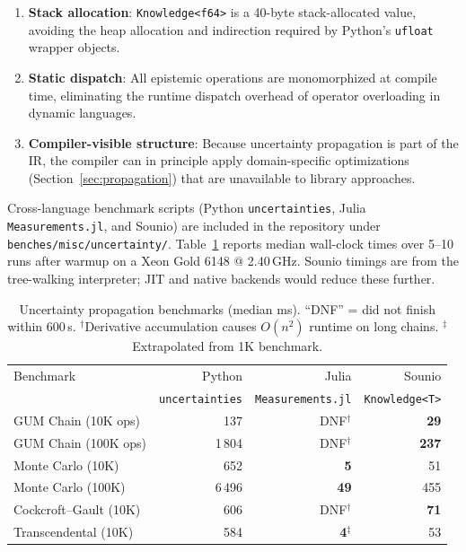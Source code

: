 \documentclass[11pt,a4paper]{article}
\begin{document}
\begin{enumerate}
  \item \textbf{Stack allocation}: \texttt{Knowledge<f64>} is a 40-byte
        stack-allocated value, avoiding the heap allocation and indirection
        required by Python's \texttt{ufloat} wrapper objects.
  \item \textbf{Static dispatch}: All epistemic operations are monomorphized
        at compile time, eliminating the runtime dispatch overhead of
        operator overloading in dynamic languages.
  \item \textbf{Compiler-visible structure}: Because uncertainty propagation
        is part of the IR, the compiler can in principle apply
        domain-specific optimizations (Section~\ref{sec:propagation})
        that are unavailable to library approaches.
\end{enumerate}

Cross-language benchmark scripts (Python \texttt{uncertainties},
Julia \texttt{Measurements.jl}, and Sounio) are included in the repository
under \texttt{benches/misc/uncertainty/}. Table~\ref{tab:uncertainty-benchmarks}
reports median wall-clock times over 5--10 runs after warmup on a
Xeon Gold 6148 @ 2.40\,GHz. Sounio timings are from the tree-walking
interpreter; JIT and native backends would reduce these further.

\begin{table}[!t]
\caption{Uncertainty propagation benchmarks (median ms).
``DNF'' = did not finish within 600\,s.
$^{\dagger}$Derivative accumulation causes $O(n^2)$ runtime on long chains.
$^{\ddagger}$Extrapolated from 1K benchmark.}
\label{tab:uncertainty-benchmarks}
\centering
\begin{tabular}{lrrr}
\toprule
Benchmark & Python & Julia & Sounio \\
 & \texttt{uncertainties} & \texttt{Measurements.jl} & \texttt{Knowledge<T>} \\
\midrule
GUM Chain (10K ops) & 137 & DNF$^{\dagger}$ & \textbf{29} \\
GUM Chain (100K ops) & 1\,804 & DNF$^{\dagger}$ & \textbf{237} \\
Monte Carlo (10K) & 652 & \textbf{5} & 51 \\
Monte Carlo (100K) & 6\,496 & \textbf{49} & 455 \\
Cockcroft--Gault (10K) & 606 & DNF$^{\dagger}$ & \textbf{71} \\
Transcendental (10K) & 584 & \textbf{4}$^{\ddagger}$ & 53 \\
\bottomrule
\end{tabular}
\end{table}
\end{document}
